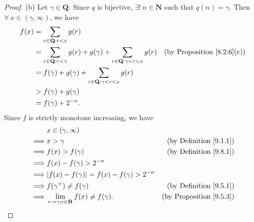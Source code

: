 \begin{proof}{(b)}
    Let \(\gamma \in \mathbf{Q}\).
    Since \(q\) is bijective, \(\exists!\ n \in \mathbf{N}\) such that \(q(n) = \gamma\).
    Then \(\forall\ x \in (\gamma, \infty)\), we have
    \begin{align*}
        f(x) & = \sum_{r \in \mathbf{Q} : r < x} g(r)                                                                                                           \\
             & = \sum_{r \in \mathbf{Q} : r < \gamma} g(r) + g(\gamma) + \sum_{r \in \mathbf{Q} : \gamma < r < x} g(r) & \text{(by Proposition \ref{8.2.6}(c))} \\
             & = f(\gamma) + g(\gamma) + \sum_{r \in \mathbf{Q} : \gamma < r < x} g(r)                                                                          \\
             & > f(\gamma) + g(\gamma)                                                                                                                          \\
             & = f(\gamma) + 2^{-n}.
    \end{align*}
    Since \(f\) is strictly monotone increasing, we have
    \begin{align*}
                 & x \in (\gamma, \infty)                                                                            \\
        \implies & x > \gamma                                                  & \text{(by Definition \ref{9.1.1})}  \\
        \implies & f(x) > f(\gamma)                                            & \text{(by Definition \ref{9.8.1})}  \\
        \implies & f(x) - f(\gamma) > 2^{-n}                                                                         \\
        \implies & \abs*{f(x) - f(\gamma)} = f(x) - f(\gamma) > 2^{-n}                                               \\
        \implies & f(\gamma^+) \neq f(\gamma)                                  & \text{(by Definition \ref{9.5.1})}  \\
        \implies & \lim_{r \to \gamma ; r \in \mathbf{R}} f(x) \neq f(\gamma). & \text{(by Proposition \ref{9.5.3})}
    \end{align*}
\end{proof}

